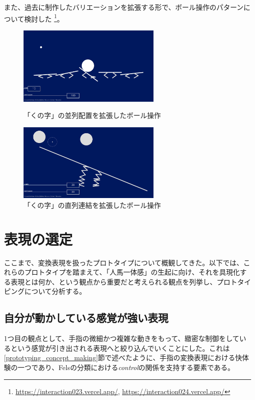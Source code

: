 また、過去に制作したバリエーションを拡張する形で、ボール操作のパターンについて検討した \footnote{\url{https://interaction023.vercel.app/}, \url{https://interaction024.vercel.app/}}。

\begin{figure}[htbp]
  \begin{minipage}[b]{0.5\linewidth}
    \centering
    \includegraphics[keepaspectratio, width=7cm]{img/ball_0.png}
    \caption{「くの字」の並列配置を拡張したボール操作}
    \label{fig:ball_0}
  \end{minipage}
  \begin{minipage}[b]{0.5\linewidth}
    \centering
    \includegraphics[keepaspectratio, width=7cm]{img/ball_1.png}
    \caption{「くの字」の直列連結を拡張したボール操作}
    \label{fig:ball_1}
  \end{minipage}
\end{figure}

\section{表現の選定}
ここまで、変換表現を扱ったプロトタイプについて概観してきた。以下では、これらのプロトタイプを踏まえて、「人馬一体感」の生起に向け、それを具現化する表現とは何か、という観点から重要だと考えられる観点を列挙し、プロトタイピングについて分析する。

\subsection{自分が動かしている感覚が強い表現}
1つ目の観点として、手指の微細かつ複雑な動きをもって、緻密な制御をしているという感覚が引き出される表現へと絞り込んでいくことにした。これは\ref{prototyping_concept_making}節で述べたように、手指の変換表現における快体験の一つであり、Felsの分類における\textit{control}の関係を支持する要素である。


